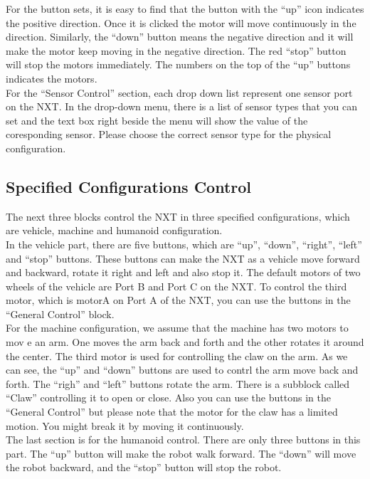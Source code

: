 \documentclass[11pt]{article}
\begin{document}
For the button sets, it is easy to find that the button with the ``up'' icon 
indicates the positive direction. Once it is clicked the motor will move 
continuously in the direction. Similarly, the ``down'' button means the negative 
direction and it will make the motor keep moving in the negative direction. The 
red ``stop'' button will stop the motors immediately. The numbers on the top of 
the ``up'' buttons indicates the motors. \\

For the ``Sensor Control'' section, each drop down list represent one sensor 
port on the NXT. In the drop-down menu, there is a list of sensor types that 
you can set and the text box right beside the menu will show the value of the 
coresponding sensor. Please choose the correct sensor type for the physical 
configuration.

\subsection{Specified Configurations Control\label{sec:gui_specifiedcontrol}}
The next three blocks control the NXT in three specified configurations, which 
are vehicle, machine and humanoid configuration. \\

In the vehicle part, there are five buttons, which are ``up'', ``down'', ``right'', 
``left'' and ``stop'' buttons. These buttons can make the NXT as a vehicle move
forward and backward, rotate it right and left and also stop it. The default
motors of two wheels of the vehicle are Port B and Port C on the NXT. To control 
the third motor, which is motorA on Port A of the NXT, you can use the buttons
in the ``General Control'' block.\\

For the machine configuration, we assume that the machine has two motors to mov
e an arm. One moves the arm back and forth and the other rotates it around the 
center. The third motor is used for controlling the claw on the arm. As we can 
see, the ``up'' and ``down'' buttons are used to contrl the arm move back and 
forth. The ``righ'' and ``left'' buttons rotate the arm. There is a subblock 
called ``Claw'' controlling it to open or close. Also you can use the buttons 
in the ``General Control'' but please note that the motor for the claw has a 
limited motion. You might break it by moving it continuously.\\

The last section is for the humanoid control. There are only three buttons in this
part. The ``up'' button will make the robot walk forward. The ``down'' will move 
the robot backward, and the ``stop'' button will stop the robot.\\
\end{document}
